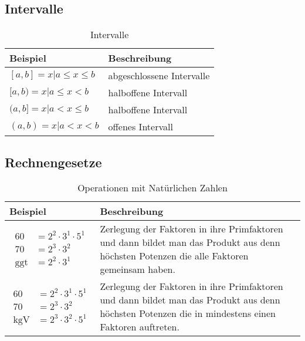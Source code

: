 \subsection{Intervalle}

\begin{table}[htbp]
 \caption{Intervalle}
\label{tab:interv:1}
\begin{tabularx}{\textwidth}{p{4cm}X}
\toprule
 Beispiel & Beschreibung \\
\midrule
\noindent
$[a,b]={x|a\leq x\leq b}$ & abgeschlossene Intervalle \\
$[a,b)={x|a\leq x < b}$ & halboffene Intervall\\
$(a,b]={x|a< x \leq b}$ & halboffene Intervall\\
$(a,b)={x|a<x<b}$ & offenes Intervall\\
\bottomrule
\end{tabularx}
\end{table}

\subsection{Rechnengesetze}

\begin{table}[htbp]
 \caption{Operationen mit Natürlichen Zahlen}
\label{tab:nat:1}
\begin{tabularx}{\textwidth}{p{3cm}X}
\toprule
 Beispiel & Beschreibung \\
\midrule
{\begin{align*}60 & =2^2\cdot3^1\cdot5^1 \\ 70 & =2^3\cdot3^2\\\text{ggt} & = 2^2\cdot3^1\end{align*}} & Zerlegung der Faktoren in ihre Primfaktoren und dann bildet man das Produkt aus denn höchsten Potenzen die alle Faktoren gemeinsam haben. \\
{\begin{align*}60 & =2^2\cdot3^1\cdot5^1 \\ 70 & =2^3\cdot3^2\\\text{kgV} & = 2^3\cdot3^2\cdot5^1\end{align*}}  &
Zerlegung der Faktoren in ihre Primfaktoren und dann bildet man das Produkt aus denn höchsten Potenzen die in mindestens einen Faktoren auftreten. \\
\bottomrule
\end{tabularx}
\end{table}

